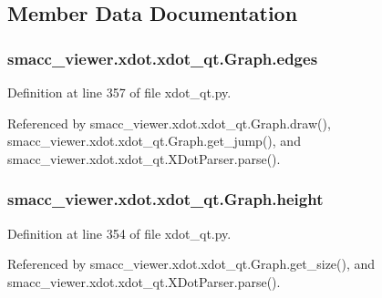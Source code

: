 \subsection{Member Data Documentation}
\subsubsection[{\texorpdfstring{edges}{edges}}]{\setlength{\rightskip}{0pt plus 5cm}smacc\+\_\+viewer.\+xdot.\+xdot\+\_\+qt.\+Graph.\+edges}\hypertarget{classsmacc__viewer_1_1xdot_1_1xdot__qt_1_1Graph_ae40379a0c30a3797a7db037038fea76d}{}\label{classsmacc__viewer_1_1xdot_1_1xdot__qt_1_1Graph_ae40379a0c30a3797a7db037038fea76d}


Definition at line 357 of file xdot\+\_\+qt.\+py.



Referenced by smacc\+\_\+viewer.\+xdot.\+xdot\+\_\+qt.\+Graph.\+draw(), smacc\+\_\+viewer.\+xdot.\+xdot\+\_\+qt.\+Graph.\+get\+\_\+jump(), and smacc\+\_\+viewer.\+xdot.\+xdot\+\_\+qt.\+X\+Dot\+Parser.\+parse().

\subsubsection[{\texorpdfstring{height}{height}}]{\setlength{\rightskip}{0pt plus 5cm}smacc\+\_\+viewer.\+xdot.\+xdot\+\_\+qt.\+Graph.\+height}\hypertarget{classsmacc__viewer_1_1xdot_1_1xdot__qt_1_1Graph_a4cad77b2943cc64a83492fe2f11fd799}{}\label{classsmacc__viewer_1_1xdot_1_1xdot__qt_1_1Graph_a4cad77b2943cc64a83492fe2f11fd799}


Definition at line 354 of file xdot\+\_\+qt.\+py.



Referenced by smacc\+\_\+viewer.\+xdot.\+xdot\+\_\+qt.\+Graph.\+get\+\_\+size(), and smacc\+\_\+viewer.\+xdot.\+xdot\+\_\+qt.\+X\+Dot\+Parser.\+parse().

